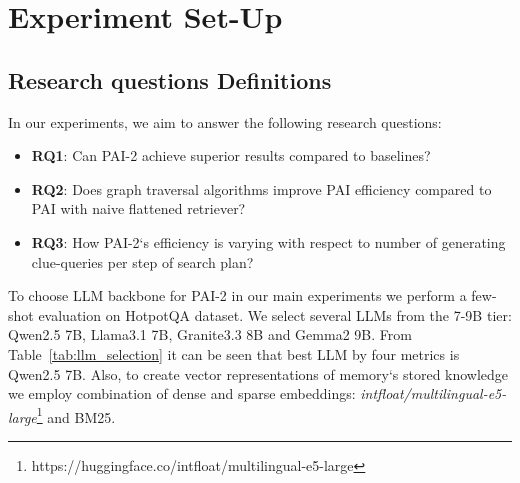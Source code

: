 \section{Experiment Set-Up}


\subsection{Research questions Definitions}

In our experiments, we aim to answer the following research questions:
\begin{itemize}
    \item \textbf{RQ1}: Can PAI-2 achieve superior results compared to baselines?
    \item \textbf{RQ2}: Does graph traversal algorithms improve PAI efficiency compared to PAI with naive flattened retriever?
    \item \textbf{RQ3}: How PAI-2`s efficiency is varying with respect to number of generating clue-queries per step of search plan?  
\end{itemize}

To choose LLM backbone for PAI-2 in our main experiments we perform a few-shot evaluation on HotpotQA dataset. We select several LLMs from the 7-9B tier: Qwen2.5 7B, Llama3.1 7B, Granite3.3 8B and Gemma2 9B. From Table~\ref{tab:llm_selection} it can be seen that best LLM by four metrics is Qwen2.5 7B. Also, to create vector representations of memory`s stored knowledge we employ combination of dense and sparse embeddings: \textit{intfloat/multilingual-e5-large}\footnote{https://huggingface.co/intfloat/multilingual-e5-large} and BM25.

